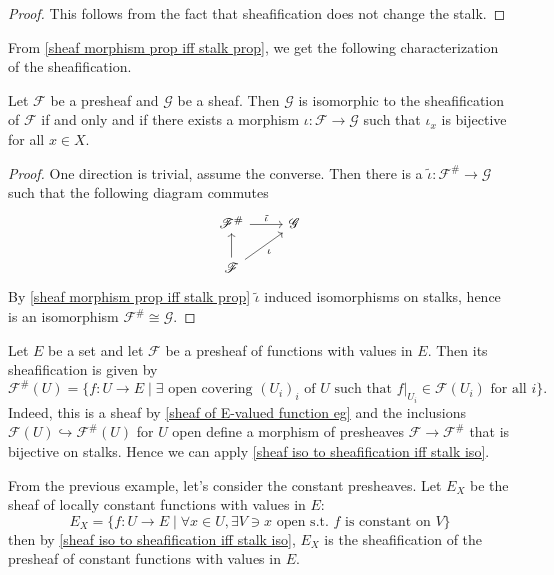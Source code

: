 \begin{proof}
This follows from the fact that sheafification does not change the stalk.
\end{proof}
From \cref{sheaf morphism prop iff stalk prop}, we get the following characterization of the sheafification.
\begin{proposition}\label{sheaf iso to sheafification iff stalk iso}
Let $\mathscr{F}$ be a presheaf and $\mathscr{G}$ be a sheaf. Then $\mathscr{G}$ is isomorphic to the sheafification of $\mathscr{F}$ if and only and if there exists a morphism $\iota:\mathscr{F}\to\mathscr{G}$ such that $\iota_x$ is bijective for all $x\in X$.
\end{proposition}
\begin{proof}
One direction is trivial, assume the converse. Then there is a $\tilde{\iota}:\mathscr{F}^{\#}\to\mathscr{G}$ such that the following diagram commutes
\[\begin{tikzcd}
\mathscr{F}^{\#}\ar[r,"\tilde{\iota}"]&\mathscr{G}\\
\mathscr{F}\ar[ru,swap,"\iota"]\ar[u]
\end{tikzcd}\]
By \cref{sheaf morphism prop iff stalk prop} $\tilde{\iota}$ induced isomorphisms on stalks, hence is an isomorphism $\mathscr{F}^{\#}\cong\mathscr{G}$.
\end{proof}
\begin{example}\label{sheafification presheaf of function}
Let $E$ be a set and let $\mathscr{F}$ be a presheaf of functions with values in $E$. Then its sheafification is given by
\[\mathscr{F}^{\#}(U)=\{f:U\to E\mid\exists\text{ open covering $(U_i)_i$ of $U$ such that $f|_{U_i}\in\mathscr{F}(U_i)$ for all $i$}\}.\]
Indeed, this is a sheaf by \cref{sheaf of E-valued function eg} and the inclusions $\mathscr{F}(U)\hookrightarrow\mathscr{F}^{\#}(U)$ for $U$ open define a morphism of presheaves $\mathscr{F}\to\mathscr{F}^{\#}$ that is bijective on stalks. Hence we can apply \cref{sheaf iso to sheafification iff stalk iso}.
\end{example}
\begin{example}
From the previous example, let's consider the constant presheaves. Let $E_{X}$ be the sheaf of locally constant functions with values in $E$:
\[E_X=\{f:U\to E\mid \forall x\in U,\exists V\ni x\text{ open s.t. $f$ is constant on $V$}\}\]
then by \cref{sheaf iso to sheafification iff stalk iso}, $E_X$ is the sheafification of the presheaf of constant functions with values in $E$.
\end{example}
